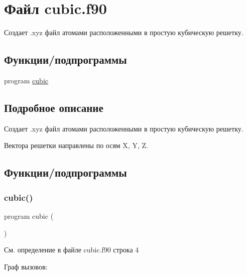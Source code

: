 \hypertarget{cubic_8f90}{}\section{Файл cubic.\+f90}
\label{cubic_8f90}


Создает .xyz файл атомами расположенными в простую кубическую решетку.  


\subsection*{Функции/подпрограммы}
\begin{DoxyCompactItemize}
\item 
program \mbox{\hyperlink{cubic_8f90_a1b83aebbc4ff5b145e61fbd4a00e6b02}{cubic}}
\end{DoxyCompactItemize}


\subsection{Подробное описание}
Создает .xyz файл атомами расположенными в простую кубическую решетку. 

Вектора решетки направлены по осям X, Y, Z. 

\subsection{Функции/подпрограммы}
\mbox{\label{cubic_8f90_a1b83aebbc4ff5b145e61fbd4a00e6b02}} 
\subsubsection{\texorpdfstring{cubic()}{cubic()}}
{\footnotesize\ttfamily program cubic (\begin{DoxyParamCaption}{ }\end{DoxyParamCaption})}



См. определение в файле cubic.\+f90 строка 4

Граф вызовов\+:
